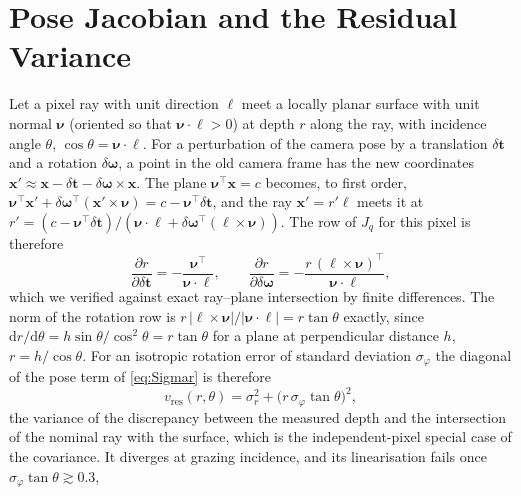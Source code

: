 \appendices

\section{Pose Jacobian and the Residual Variance}
\label{app:variance}
Let a pixel ray with unit direction $\boldsymbol\ell$ meet a locally planar surface with unit
normal $\boldsymbol\nu$ (oriented so that $\boldsymbol\nu\cdot\boldsymbol\ell>0$) at depth $r$ along
the ray, with incidence angle $\theta$, $\cos\theta=\boldsymbol\nu\cdot\boldsymbol\ell$. For a perturbation of
the camera pose by a translation $\delta\mathbf{t}$ and a rotation $\delta\boldsymbol\omega$, a point
in the old camera frame has the new coordinates $\mathbf{x}'\approx\mathbf{x}-\delta\mathbf{t}-\delta\boldsymbol\omega\times\mathbf{x}$.
The plane $\boldsymbol\nu^{\top}\mathbf{x}=c$ becomes, to first order,
$\boldsymbol\nu^{\top}\mathbf{x}'+\delta\boldsymbol\omega^{\top}(\mathbf{x}'\times\boldsymbol\nu)=c-\boldsymbol\nu^{\top}\delta\mathbf{t}$, and
the ray $\mathbf{x}'=r'\boldsymbol\ell$ meets it at
$r'=(c-\boldsymbol\nu^{\top}\delta\mathbf{t})/(\boldsymbol\nu\cdot\boldsymbol\ell+\delta\boldsymbol\omega^{\top}(\boldsymbol\ell\times\boldsymbol\nu))$.
The row of $J_q$ for this pixel is therefore
\begin{equation}
  \frac{\partial r}{\partial\delta\mathbf{t}}=-\frac{\boldsymbol\nu^{\top}}{\boldsymbol\nu\cdot\boldsymbol\ell},\qquad
  \frac{\partial r}{\partial\delta\boldsymbol\omega}=-\frac{r\,(\boldsymbol\ell\times\boldsymbol\nu)^{\top}}{\boldsymbol\nu\cdot\boldsymbol\ell},
  \label{eq:Jq}
\end{equation}
which we verified against exact ray--plane intersection by finite differences. The norm of the
rotation row is $r\,|\boldsymbol\ell\times\boldsymbol\nu|/|\boldsymbol\nu\cdot\boldsymbol\ell|=r\tan\theta$ exactly,
since $\mathrm{d}r/\mathrm{d}\theta=h\sin\theta/\cos^{2}\theta=r\tan\theta$ for a plane at
perpendicular distance $h$, $r=h/\cos\theta$. For an isotropic rotation error of standard
deviation $\sigma_\varphi$ the diagonal of the pose term of \eqref{eq:Sigmar} is therefore
\begin{equation}
  v_{\mathrm{res}}(r,\theta)=\sigma_r^{2}+\bigl(r\,\sigma_\varphi\tan\theta\bigr)^{2},
  \label{eq:vres}
\end{equation}
the variance of the discrepancy between the measured depth and the intersection of the nominal
ray with the surface, which is the independent-pixel special case of the covariance. It
diverges at grazing incidence, and its linearisation fails once $\sigma_\varphi\tan\theta\gtrsim0.3$,
